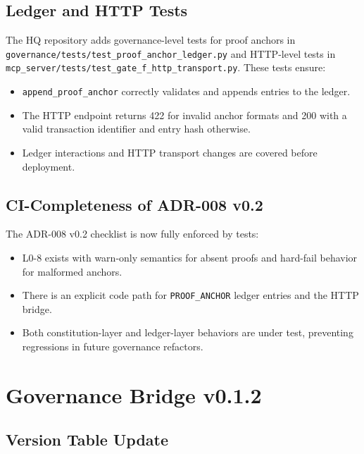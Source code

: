 \documentclass[11pt]{article}
\begin{document}
\subsection{Ledger and HTTP Tests}

The HQ repository adds governance-level tests for proof anchors in \texttt{governance/tests/test\_proof\_anchor\_ledger.py} and HTTP-level tests in \texttt{mcp\_server/tests/test\_gate\_f\_http\_transport.py}.\cite{cite:41} These tests ensure:
\begin{itemize}[nosep]
  \item \texttt{append\_proof\_anchor} correctly validates and appends entries to the ledger.
  \item The HTTP endpoint returns 422 for invalid anchor formats and 200 with a valid transaction identifier and entry hash otherwise.
  \item Ledger interactions and HTTP transport changes are covered before deployment.\cite{cite:41}
\end{itemize}

\subsection{CI-Completeness of ADR-008 v0.2}

The ADR-008 v0.2 checklist is now fully enforced by tests:\cite{cite:41,cite:43}
\begin{itemize}[nosep]
  \item L0-8 exists with warn-only semantics for absent proofs and hard-fail behavior for malformed anchors.
  \item There is an explicit code path for \texttt{PROOF\_ANCHOR} ledger entries and the HTTP bridge.
  \item Both constitution-layer and ledger-layer behaviors are under test, preventing regressions in future governance refactors.
\end{itemize}


\section{Governance Bridge v0.1.2}

\subsection{Version Table Update}
\end{document}
